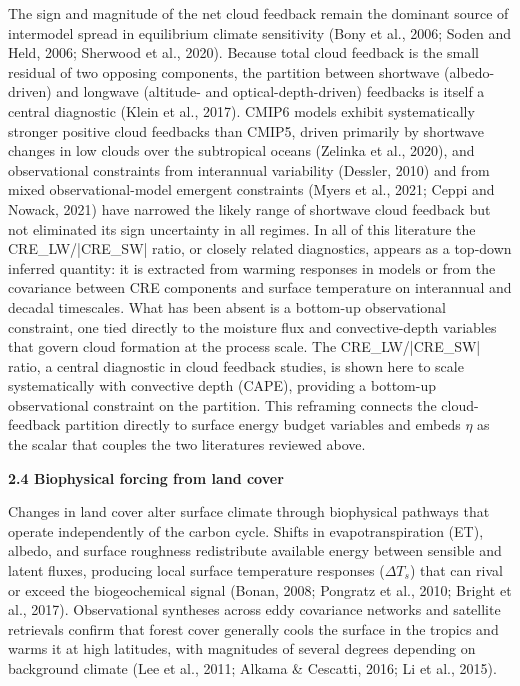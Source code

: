 The sign and magnitude of the net cloud feedback remain the dominant source of intermodel spread in equilibrium climate sensitivity (Bony et al., 2006; Soden and Held, 2006; Sherwood et al., 2020). Because total cloud feedback is the small residual of two opposing components, the partition between shortwave (albedo-driven) and longwave (altitude- and optical-depth-driven) feedbacks is itself a central diagnostic (Klein et al., 2017). CMIP6 models exhibit systematically stronger positive cloud feedbacks than CMIP5, driven primarily by shortwave changes in low clouds over the subtropical oceans (Zelinka et al., 2020), and observational constraints from interannual variability (Dessler, 2010) and from mixed observational-model emergent constraints (Myers et al., 2021; Ceppi and Nowack, 2021) have narrowed the likely range of shortwave cloud feedback but not eliminated its sign uncertainty in all regimes. In all of this literature the CRE_LW/|CRE_SW| ratio, or closely related diagnostics, appears as a top-down inferred quantity: it is extracted from warming responses in models or from the covariance between CRE components and surface temperature on interannual and decadal timescales. What has been absent is a bottom-up observational constraint, one tied directly to the moisture flux and convective-depth variables that govern cloud formation at the process scale. The CRE_LW/|CRE_SW| ratio, a central diagnostic in cloud feedback studies, is shown here to scale systematically with convective depth (CAPE), providing a bottom-up observational constraint on the partition. This reframing connects the cloud-feedback partition directly to surface energy budget variables and embeds $\eta$ as the scalar that couples the two literatures reviewed above.

\textbf{2.4 Biophysical forcing from land cover}

Changes in land cover alter surface climate through biophysical pathways that operate independently of the carbon cycle. Shifts in evapotranspiration (ET), albedo, and surface roughness redistribute available energy between sensible and latent fluxes, producing local surface temperature responses ($\Delta T_s$) that can rival or exceed the biogeochemical signal (Bonan, 2008; Pongratz et al., 2010; Bright et al., 2017). Observational syntheses across eddy covariance networks and satellite retrievals confirm that forest cover generally cools the surface in the tropics and warms it at high latitudes, with magnitudes of several degrees depending on background climate (Lee et al., 2011; Alkama \& Cescatti, 2016; Li et al., 2015).

